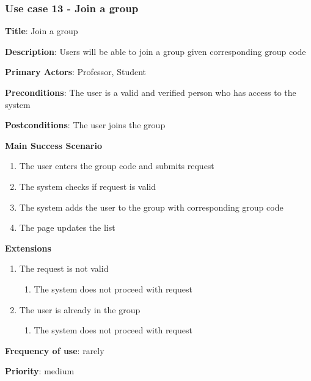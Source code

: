 \documentclass[singlespacing,12pt,parskip,headsepline,consistentlayout]{article}
\begin{document}
\subsubsection{Use case 13 - Join a group}
\begin{flushleft}
\vspace{0.2cm}
\hline
\vspace{0.2cm}
{\bfseries Title}: {Join a group}

{\bfseries Description}: {Users will be able to join a group given corresponding group code}

{\bfseries Primary Actors}: {Professor, Student}

{\bfseries Preconditions}: The user is a valid and verified person who has access to the system

{\bfseries Postconditions}: {The user joins the group}

{\bfseries Main Success Scenario}

\begin{enumerate}
      \item The user enters the group code and submits request
      \item The system checks if request is valid
      \item The system adds the user to the group with corresponding group code
      \item The page updates the list
\end{enumerate}
 
{\bfseries Extensions}

\begin{enumerate}
  \item The request is not valid
  \begin{enumerate}
      \item The system does not proceed with request
  \end{enumerate}
  \item The user is already in the group
  \begin{enumerate}
      \item The system does not proceed with request
  \end{enumerate}
\end{enumerate}

{\bfseries Frequency of use}: rarely

{\bfseries Priority}: medium

\end{flushleft}

\pagebreak
\end{document}
